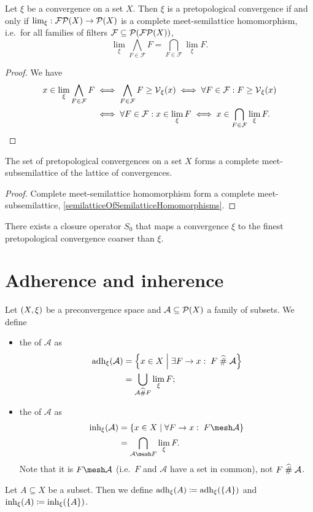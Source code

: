 \begin{proposition}
Let $\xi$ be a convergence on a set $X$. Then $\xi$ is a pretopological convergence \textup{if and only if} $\lim_\xi: \operatorname{\mathcal{FP}}(X)\to \operatorname{\mathcal{P}}(X)$ is a complete meet-semilattice homomorphism, i.e.\
for all families of filters $\mathcal{F} \subseteq \operatorname{\mathcal{P}}(\operatorname{\mathcal{FP}}(X))$,
\[ \lim_\xi \bigwedge_{F\in \mathcal{F}}F = \bigcap_{F\in\mathcal{F}}\lim_\xi F. \] 
\end{proposition}
\begin{proof}
We have
\begin{align*}
x\in \lim_\xi \bigwedge_{F\in \mathcal{F}}F &\iff \bigwedge_{F\in \mathcal{F}}F \geq \operatorname{\mathcal{V}}_\xi(x) \iff \forall F\in\mathcal{F}: F\geq \operatorname{\mathcal{V}}_\xi(x) \\
&\iff \forall F\in \mathcal{F}: x\in\lim_\xi F \iff x\in \bigcap_{F\in\mathcal{F}}\lim_\xi F.
\end{align*}
\end{proof}
\begin{corollary}
The set of pretopological convergences on a set $X$ forms a complete meet-subsemilattice of the lattice of convergences.
\end{corollary}
\begin{proof}
Complete meet-semilattice homomorphism form a complete meet-subsemilattice, \ref{semilatticeOfSemilatticeHomomorphisms}.
\end{proof}
\begin{corollary}
There exists a closure operator $S_0$ that maps a convergence $\xi$ to the finest pretopological convergence coarser than $\xi$.
\end{corollary}


\section{Adherence and inherence}
\begin{definition}
Let $\sSet{X,\xi}$ be a preconvergence space and $\mathcal{A}\subseteq \operatorname{\mathcal{P}}(X)$ a family of subsets. We define
\begin{itemize}
\item the  of $\mathcal{A}$ as
\begin{align*}
\adh_\xi(\mathcal{A}) &= \setbuilder{x\in X}{\exists F\to x: \; F\amesh\mathcal{A}} \\
&= \bigcup_{\mathcal{A}\amesh F}\lim_\xi F;
\end{align*}
\item the  of $\mathcal{A}$ as
\begin{align*}
\inh_\xi(\mathcal{A}) &= \setbuilder{x\in X}{\forall F\to x: \; F\mesh\mathcal{A}} \\
&= \bigcap_{\mathcal{A}\mesh F}\lim_\xi F.
\end{align*}
Note that it is $F\mesh\mathcal{A}$ (i.e.\ $F$ and $\mathcal{A}$ have a set in common), not $F\mathrel{\widehat{\#}}\mathcal{A}$.
\end{itemize}
Let $A\subseteq X$ be a subset. Then we define $\operatorname{adh}_\xi(A) \coloneqq \operatorname{adh}_\xi(\{A\})$ and $\operatorname{inh}_\xi(A) \coloneqq \operatorname{inh}_\xi(\{A\})$.
\end{definition}


